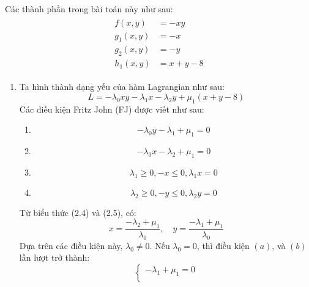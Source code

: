 \begin{solution}

    Các thành phần trong bài toán này như sau:
    \begin{align}
        \begin{aligned}
            f(x,y) &= -xy\\
            g_1(x,y) &= -x\\
            g_2(x, y) &= -y\\
            h_1(x,y) &= x + y - 8
        \end{aligned}
    \end{align}
    \begin{enumerate}
        \item Ta hình thành dạng yếu của hàm Lagrangian như sau:
    \begin{equation}
        L = -\lambda_0xy -\lambda_1x - \lambda_2y + \mu_1(x + y - 8)
    \end{equation}
    Các điều kiện Fritz John (FJ) được viết như sau:
    \begin{enumerate}[label=(\alph*)]
        \item \begin{equation}
            -\lambda_0y - \lambda_1 + \mu_1 = 0
        \end{equation}
        \item \begin{equation}
            -\lambda_0x - \lambda_2 + \mu_1 = 0
        \end{equation}
        \item \begin{equation}
            \lambda_1 \geq 0, - x \leq 0, \lambda_1x = 0
        \end{equation}
        \item \begin{equation}
            \lambda_2 \geq 0, - y \leq 0, \lambda_2y = 0
        \end{equation}
    \end{enumerate}
    Từ biểu thức (2.4) và (2.5), có:
    \begin{equation}
        x = \dfrac{-\lambda_2 + \mu_1}{\lambda_0},\quad y = \dfrac{-\lambda_1 + \mu_1}{\lambda_0}
    \end{equation}
    Dựa trên các điều kiện này, $\lambda_0 \ne 0$. Nếu $\lambda_0 = 0$, thì điều kiện $(a)$, và $(b)$ lần lượt trở thành:
    \begin{equation}
        \begin{cases}
            - \lambda_1 + \mu_1 = 0 \\ 

\end{cases}
\end{equation}
\end{enumerate}
\end{solution}
